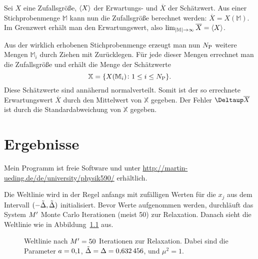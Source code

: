 Sei $X$ eine Zufallsgröße, $\langle X \rangle$ der Erwartungs- und $\overline X$ der
Schätzwert. Aus einer Stichprobenmenge $\mathbb M$ kann nun die Zufallsgröße
berechnet werden: $\overline X = X(\mathbb M)$. Im Grenzwert erhält man den
Erwartungswert, also $\lim_{|\mathbb M| \to \infty} \overline X = \langle X \rangle$.

Aus der wirklich erhobenen Stichprobenmenge erzeugt man nun $N_\text P$
weitere Mengen $\mathbb M_i$ durch Ziehen mit Zurücklegen. Für jede dieser
Mengen errechnet man die Zufallsgröße und erhält die Menge der Schätzwerte
\[
    \mathbb X = \{ X(\mathbb M_i) \colon 1 \leq i \leq N_\text P \}.
\]
Diese Schätzwerte sind annähernd normalverteilt. Somit ist der so errechnete
Erwartungswert $\overline X$ durch den Mittelwert von $\mathbb X$ gegeben. Der
Fehler $\Deltaup \overline X$ ist durch die Standardabweichung von $\mathbb X$
gegeben.

\chapter{Ergebnisse}

\begin{small}
    Mein Programm ist freie Software und unter
    \url{http://martin-ueding.de/de/university/physik590/} erhältlich.
\end{small}

Die Weltlinie wird in der Regel anfangs mit zufälligen Werten für die $x_j$ aus
dem Intervall $(-\tilde \Delta, \tilde \Delta)$ initialisiert. Bevor
Werte aufgenommen werden, durchläuft das System $M'$ Monte Carlo
Iterationen (meist \num{50}) zur Relaxation. Danach sieht die Weltlinie wie in
Abbildung~\ref{fig:relaxiert} aus.

\begin{figure}[htbp]
    \centering
    \caption{%
        Weltlinie nach $M' = \num{50}$ Iterationen zur Relaxation.
        Dabei sind die Parameter $a = \num{0.1}$, $\tilde \Delta
        = \Delta = \num{0.632456}$, und $\mu^2 = \num{1}$.
    }
    \label{fig:relaxiert}
\end{figure}

